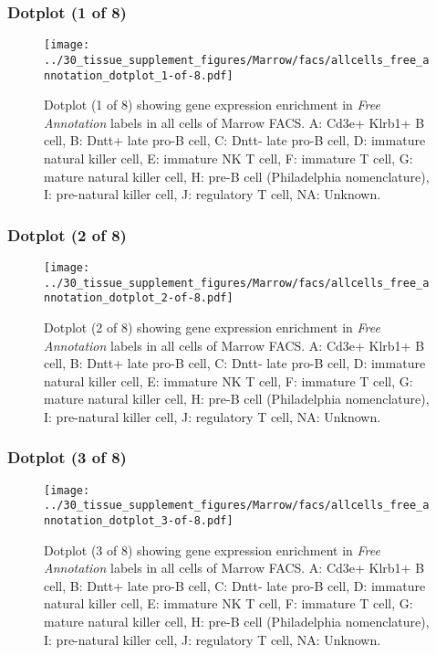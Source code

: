 \clearpage

\subsubsection{Dotplot (1 of 8)}
\begin{figure}[h]
\centering
\texttt{[image: ../30\_tissue\_supplement\_figures/Marrow/facs/allcells\_free\_annotation\_dotplot\_1-of-8.pdf]}

\caption{ Dotplot (1 of 8)  showing gene expression enrichment in \emph{Free Annotation} labels in all cells of Marrow FACS. A: Cd3e+ Klrb1+ B cell, B: Dntt+ late pro-B cell, C: Dntt- late pro-B cell, D: immature natural killer cell, E: immature NK T cell, F: immature T cell, G: mature natural killer cell, H: pre-B cell (Philadelphia nomenclature), I: pre-natural killer cell, J: regulatory T cell, NA: Unknown.}
\end{figure}


\clearpage

\subsubsection{Dotplot (2 of 8)}
\begin{figure}[h]
\centering
\texttt{[image: ../30\_tissue\_supplement\_figures/Marrow/facs/allcells\_free\_annotation\_dotplot\_2-of-8.pdf]}

\caption{ Dotplot (2 of 8)  showing gene expression enrichment in \emph{Free Annotation} labels in all cells of Marrow FACS. A: Cd3e+ Klrb1+ B cell, B: Dntt+ late pro-B cell, C: Dntt- late pro-B cell, D: immature natural killer cell, E: immature NK T cell, F: immature T cell, G: mature natural killer cell, H: pre-B cell (Philadelphia nomenclature), I: pre-natural killer cell, J: regulatory T cell, NA: Unknown.}
\end{figure}


\clearpage

\subsubsection{Dotplot (3 of 8)}
\begin{figure}[h]
\centering
\texttt{[image: ../30\_tissue\_supplement\_figures/Marrow/facs/allcells\_free\_annotation\_dotplot\_3-of-8.pdf]}

\caption{ Dotplot (3 of 8)  showing gene expression enrichment in \emph{Free Annotation} labels in all cells of Marrow FACS. A: Cd3e+ Klrb1+ B cell, B: Dntt+ late pro-B cell, C: Dntt- late pro-B cell, D: immature natural killer cell, E: immature NK T cell, F: immature T cell, G: mature natural killer cell, H: pre-B cell (Philadelphia nomenclature), I: pre-natural killer cell, J: regulatory T cell, NA: Unknown.}
\end{figure}


